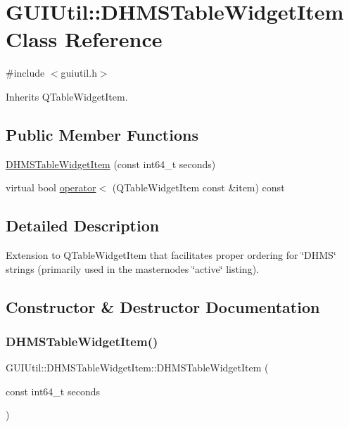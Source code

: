 \hypertarget{class_g_u_i_util_1_1_d_h_m_s_table_widget_item}{}\section{G\+U\+I\+Util\+::D\+H\+M\+S\+Table\+Widget\+Item Class Reference}
\label{class_g_u_i_util_1_1_d_h_m_s_table_widget_item}


{\ttfamily \#include $<$guiutil.\+h$>$}



Inherits Q\+Table\+Widget\+Item.

\subsection*{Public Member Functions}
\begin{DoxyCompactItemize}
\item 
\mbox{\hyperlink{class_g_u_i_util_1_1_d_h_m_s_table_widget_item_a048ab36b7b4d8ec6af77bca7fd547f95}{D\+H\+M\+S\+Table\+Widget\+Item}} (const int64\+\_\+t seconds)
\item 
virtual bool \mbox{\hyperlink{class_g_u_i_util_1_1_d_h_m_s_table_widget_item_ab386d4d66b8eb16a216ddaf73d1799fa}{operator$<$}} (Q\+Table\+Widget\+Item const \&item) const
\end{DoxyCompactItemize}


\subsection{Detailed Description}
Extension to Q\+Table\+Widget\+Item that facilitates proper ordering for \char`\"{}\+D\+H\+M\+S\char`\"{} strings (primarily used in the masternode\textquotesingle{}s \char`\"{}active\char`\"{} listing). 

\subsection{Constructor \& Destructor Documentation}
\mbox{\label{class_g_u_i_util_1_1_d_h_m_s_table_widget_item_a048ab36b7b4d8ec6af77bca7fd547f95}} 
\subsubsection{\texorpdfstring{DHMSTableWidgetItem()}{DHMSTableWidgetItem()}}
{\footnotesize\ttfamily G\+U\+I\+Util\+::\+D\+H\+M\+S\+Table\+Widget\+Item\+::\+D\+H\+M\+S\+Table\+Widget\+Item (\begin{DoxyParamCaption}\item[{const int64\+\_\+t}]{seconds }\end{DoxyParamCaption})}

